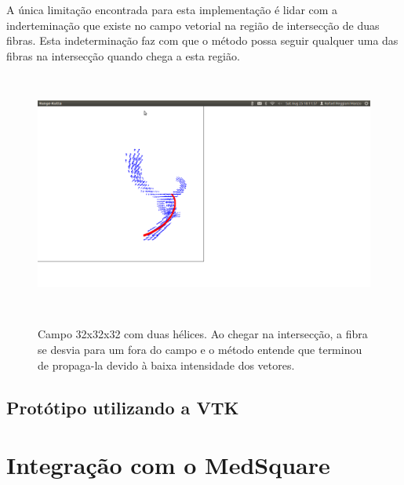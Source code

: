   A única limitação encontrada para esta implementação é lidar com a inderteminação que existe no campo vetorial na região de intersecção de duas fibras. Esta indeterminação faz com que o método possa seguir qualquer uma das fibras na intersecção quando chega a esta região.
  
  \begin{figure}[!h]
    \begin{center}
      \includegraphics[width=140mm, height=80mm]{images/fibraecampo.png}
      \label{fig:}
      \caption{Campo 32x32x32 com duas hélices. Ao chegar na intersecção, a fibra se desvia para um fora do campo e o método entende que terminou de propaga-la devido à baixa intensidade dos vetores.}
    \end{center}
  \end{figure}
  
  \newpage
  \subsection{Protótipo utilizando a VTK}
\section{Integração com o MedSquare}
